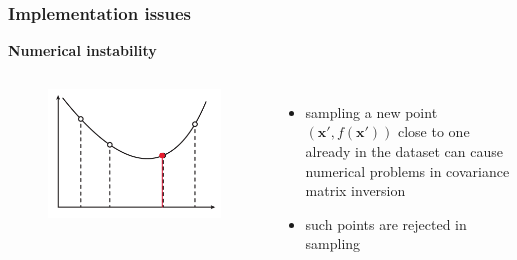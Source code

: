 \documentclass[sans,mathserif]{beamer}
\newcommand{\xx}{\mathrm{\mathbf{x}}}
\begin{document}
\begin{frame}
{\begin{figure}
    \end{figure}
  }
\end{frame}

\begin{frame}
  \frametitle{Implementation issues}
  \textbf{Numerical instability}
  \begin{columns}[T]
  \column{5cm}
    \begin{figure}
    \includegraphics[width=\linewidth]{img/numerical-instability}
    \end{figure}
  \column{5.5cm}
    \begin{itemize}
      \item sampling a new point $(\xx', f(\xx'))$ close to one already in
          the dataset can cause numerical problems in covariance matrix inversion
      \item such points are rejected in sampling
    \end{itemize}
  \end{columns}
\end{frame}
\end{document}
